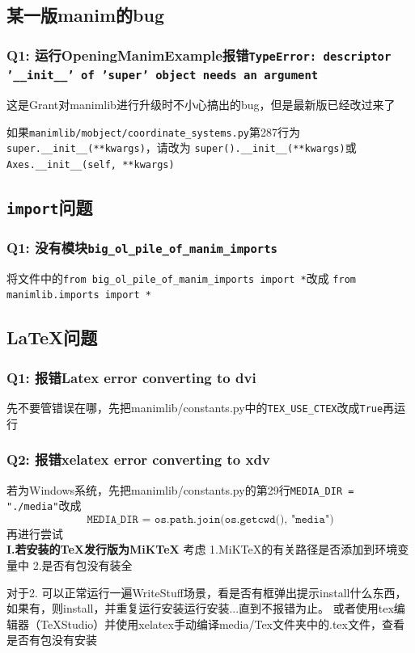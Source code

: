 \documentclass[UTF8]{ctexart}
\begin{document}
\subsection{某一版manim的bug}
\subsubsection*{Q1: 运行OpeningManimExample报错\texttt{TypeError: descriptor '\_\_init\_\_' of 'super' object needs an argument}}
这是Grant对manimlib进行升级时不小心搞出的bug，但是最新版已经改过来了

如果\texttt{manimlib/mobject/coordinate\_systems.py}第287行为\texttt{super.\_\_init\_\_(**kwargs)}，请改为
\texttt{super().\_\_init\_\_(**kwargs)}或\texttt{Axes.\_\_init\_\_(self, **kwargs)}

\subsection{\texttt{import}问题}
\subsubsection*{Q1: 没有模块\texttt{big\_ol\_pile\_of\_manim\_imports}}
将文件中的\texttt{from big\_ol\_pile\_of\_manim\_imports import *}改成
\texttt{from manimlib.imports import *}

\subsection{\LaTeX 问题}

\subsubsection*{Q1: 报错Latex error converting to dvi}
先不要管错误在哪，先把manimlib/constants.py中的\texttt{TEX\_USE\_CTEX}改成\texttt{True}再运行

\subsubsection*{Q2: 报错xelatex error converting to xdv}
若为Windows系统，先把manimlib/constants.py的第29行\texttt{MEDIA\_DIR = "./media"}改成
$$
\texttt{MEDIA\_DIR = os.path.join(os.getcwd(), "media")}
$$
再进行尝试\\

\textbf{I.若安装的\TeX 发行版为MiK\TeX}
考虑 1.MiK\TeX 的有关路径是否添加到环境变量中 2.是否有包没有装全

对于2. 可以正常运行一遍WriteStuff场景，看是否有框弹出提示install什么东西，如果有，则install，并重复运行安装运行安装...直到不报错为止。
或者使用tex编辑器（\TeX Studio）并使用xelatex手动编译media/Tex文件夹中的.tex文件，查看是否有包没有安装
\end{document}
